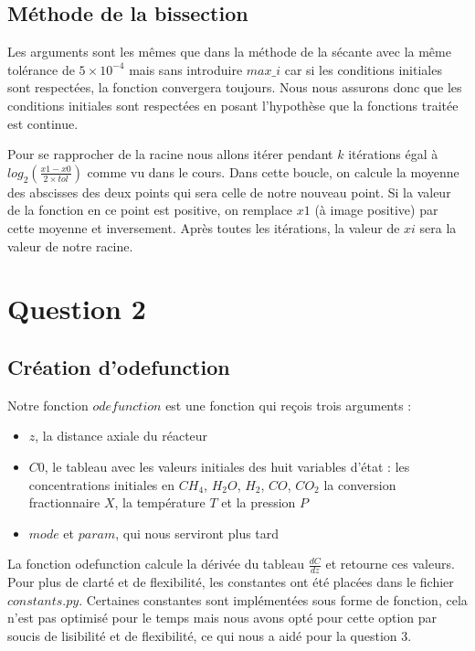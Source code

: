 \documentclass[11pt]{report}
\newcommand{\mychapter}[2]{
    \setcounter{chapter}{#1}
    \setcounter{section}{0}
    \chapter*{#2}
    \addcontentsline{toc}{chapter}{#2}
}
\begin{document}
        \section{Méthode de la bissection}
            Les arguments sont les mêmes que dans la méthode de la sécante avec la même tolérance de $5\times10^{-4}$ mais sans introduire $max\_i$
            car si les conditions initiales sont respectées, la fonction convergera toujours.
            Nous nous assurons donc que les conditions initiales sont respectées en posant l'hypothèse que la fonctions traitée est continue.
            \par
            Pour se rapprocher de la racine nous allons itérer pendant $k$ itérations égal à\\
            $log_2(\frac{x1-x0}{2{\times}tol})$ comme vu dans le cours.
            Dans cette boucle, on calcule la moyenne des abscisses des deux points qui sera celle de notre nouveau point.
            Si la valeur de la fonction en ce point est positive, on remplace $x1$ (à image positive) par cette moyenne et inversement.
            Après toutes les itérations, la valeur de $xi$ sera la valeur de notre racine.

    \mychapter{2}{Question 2}
        \section{Création d'odefunction}
            Notre fonction $odefunction$ est une fonction qui reçois trois arguments :
            \begin{itemize}
                \item $z$, la distance axiale  du réacteur
                \item $C0$, le tableau avec les valeurs initiales des huit variables d'état :
                    les concentrations initiales en $CH_4$, $H_2O$, $H_2$, $CO$, $CO_2$
                    la conversion fractionnaire $X$,
                    la température $T$
                    et la pression $P$
                \item $mode$ et $param$, qui nous serviront plus tard
            \end{itemize}
            La fonction odefunction calcule la dérivée du tableau $\frac{dC}{dz}$ et retourne ces valeurs.
            Pour plus de clarté et de flexibilité, les constantes ont été placées dans le fichier $constants.py$.
            Certaines constantes sont implémentées sous forme de fonction,
            cela n'est pas optimisé pour le temps mais nous avons opté pour cette option par soucis de lisibilité
            et de flexibilité, ce qui nous a aidé pour la question 3.
\end{document}
